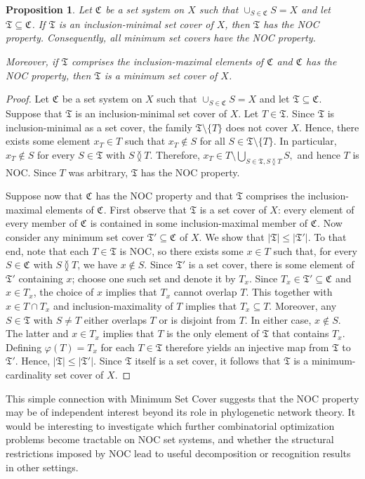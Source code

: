 \documentclass[preprint]{elsarticle}
\newtheorem{proposition}[theorem]{Proposition}
\newcommand{\CS}[1][]{\ensuremath{\mathfrak{C}_{#1}}}
\newcommand{\Tsys}{\ensuremath{\mathfrak{T}}}
\newcommand{\overlaps}{\between}
\begin{document}
\begin{proposition}\label{prop:set-cover}
	Let $\CS$ be a set system on $X$ such that $\cup_{S\in\CS}S=X$ and let $\Tsys\subseteq\CS$.
   	If $\Tsys$ is an inclusion-minimal set cover of $X$, then $\Tsys$ has the NOC property.
	Consequently, all minimum set covers have the NOC property. 
 
   Moreover, if $\Tsys$ comprises the inclusion-maximal elements of $\CS$ and $\CS$ has the NOC 
   property, then $\Tsys$ is a minimum set cover of $X$.
\end{proposition}
\begin{proof}
	Let $\CS$ be a set system on $X$ such that $\cup_{S\in\CS}S=X$ and let
	$\Tsys\subseteq\CS$. Suppose that $\Tsys$ is an inclusion-minimal set cover of $X$. Let
	$T\in\Tsys$. Since $\Tsys$ is inclusion-minimal as a set cover, the family $\Tsys\setminus \{T\}$
	does not cover $X$. Hence, there exists some element $x_T\in T$ such that $x_T\notin S$ for all
	$S\in\Tsys\setminus\{T\}$. In particular, $ x_T\notin S $ for every $S\in\Tsys$ with $S\overlaps
	T$. Therefore, $ x_T\in T\setminus \bigcup_{S\in\Tsys,S\overlaps T}S, $ and hence
	$T$ is NOC. Since $T$ was arbitrary, $\Tsys$ has the NOC property.

    
    Suppose now that $\CS$ has the NOC 
    property and that $\Tsys$ comprises the inclusion-maximal elements of $\CS$. 
    First observe that $\Tsys$ is a set cover of $X$: every element of every member of
    $\CS$ is contained in some inclusion-maximal member of $\CS$. 
    Now consider any minimum set cover $\Tsys'\subseteq\CS$ of $X$. We show that $|\Tsys|\leq|\Tsys'|$. 
	To that end, note that each $T\in\Tsys$ is NOC, so there exists some
    $x\in T$ such that, for every $S\in\CS$ with $S\overlaps T$, we have $x\notin S$. Since
    $\Tsys'$ is a set cover, there is some element of $\Tsys'$ containing $x$; choose one such set
    and denote it by $T_x$. 
    Since $T_x\in\Tsys'\subseteq\CS$ and $x\in T_x$, the choice of $x$ implies that $T_x$ cannot overlap $T$.
    This together with
    $x\in T\cap T_x$ and inclusion-maximality of $T$ implies that $T_x\subseteq T$. Moreover, any
    $S\in\Tsys$ with $S\neq T$ either overlaps $T$ or is disjoint from $T$. In
    either case, $x\notin S$. The latter and $x\in T_x$ implies that $T$ is the only element of
    $\Tsys$ that contains $T_x$. Defining $\varphi(T)=T_x$ for each $T\in \Tsys$ therefore yields an
    injective map from $\Tsys$ to $\Tsys'$. Hence, $|\Tsys|\leq|\Tsys'|$. Since $\Tsys$ itself is a set cover, it follows
    that $\Tsys$ is a minimum-cardinality set cover of $X$.
\end{proof}

This simple connection with Minimum Set Cover suggests that the NOC property may be of independent
interest beyond its role in phylogenetic network theory. It would be interesting to investigate
which further combinatorial optimization problems become tractable on NOC set systems, and whether
the structural restrictions imposed by NOC lead to useful decomposition or recognition results in
other settings.




\end{document}
